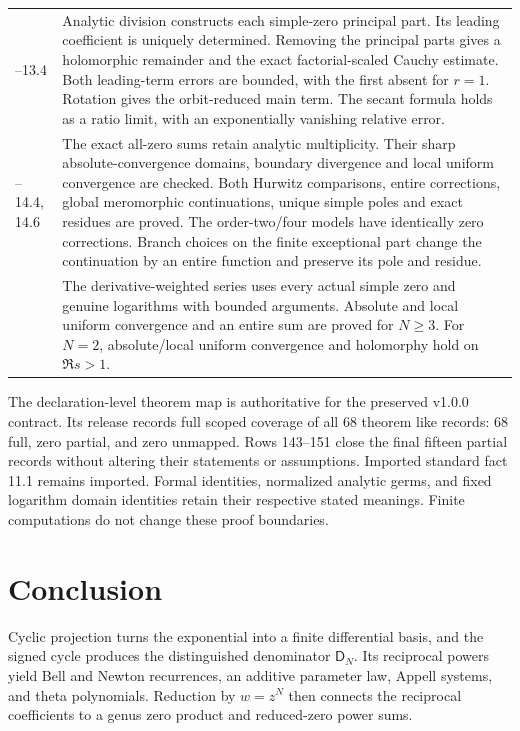 \documentclass[11pt,letterpaper]{article}
\theoremstyle{definition}
\theoremstyle{remark}
\newcommand{\Dfun}{\mathsf D}
\begin{document}
\begin{longtable}{@{}>{\raggedright\arraybackslash}p{}>{\raggedright\arraybackslash}p{}@{}}
13.1--13.4 & Analytic division constructs each simple-zero principal part.
Its leading coefficient is uniquely determined. Removing the principal parts
gives a holomorphic remainder and the exact factorial-scaled Cauchy estimate.
Both leading-term errors are bounded, with the first absent for $r=1$.
Rotation gives the orbit-reduced main term. The secant formula holds as a
ratio limit, with an exponentially vanishing relative error. \\
14.2--14.4, 14.6 & The exact all-zero sums retain analytic multiplicity.
Their sharp absolute-convergence domains, boundary divergence and local
uniform convergence are checked. Both Hurwitz comparisons, entire corrections,
global meromorphic continuations, unique simple poles and exact residues are
proved. The order-two/four models have identically zero corrections. Branch
choices on the finite exceptional part change the continuation by an entire
function and preserve its pole and residue. \\
14.8 & The derivative-weighted series uses every actual simple zero and genuine
logarithms with bounded arguments. Absolute and local uniform convergence and
an entire sum are proved for $N\geq3$. For $N=2$, absolute/local uniform
convergence and holomorphy hold on $\Re s>1$. \\
\bottomrule
\end{longtable}
\endgroup

The declaration-level theorem map is authoritative for the preserved
v1.0.0 contract. Its release records full scoped coverage of all 68
theorem like records: 68 full, zero partial, and zero unmapped. Rows 143--151 close the final fifteen partial records
without altering their statements or assumptions. Imported standard fact
11.1 remains imported. Formal identities, normalized analytic germs, and
fixed logarithm domain identities retain their respective stated meanings.
Finite computations do not change these proof boundaries.

\section{Conclusion}\label{sec:conclusion}

Cyclic projection turns the exponential into a finite differential basis, and
the signed cycle produces the distinguished denominator $\Dfun_N$. Its
reciprocal powers yield Bell and Newton recurrences, an additive parameter
law, Appell systems, and theta polynomials. Reduction by $w=z^N$ then connects
the reciprocal coefficients to a genus zero product and reduced-zero power
sums.
\end{document}
